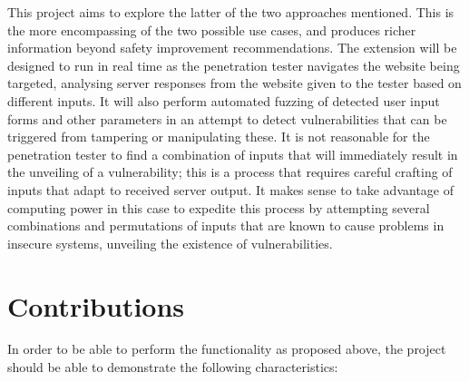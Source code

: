 This project aims to explore the latter of the two approaches mentioned. 
This is the more encompassing of the two possible use cases, and produces richer information beyond safety improvement recommendations. 
The extension will be designed to run in real time as the penetration tester navigates the website being targeted, analysing server responses from the website given to the tester based on different inputs. 
It will also perform automated fuzzing of detected user input forms and other parameters in an attempt to detect vulnerabilities that can be triggered from tampering or manipulating these.
It is not reasonable for the penetration tester to find a combination of inputs that will immediately result in the unveiling of a vulnerability; this is a process that requires careful crafting of inputs that adapt to received server output.
It makes sense to take advantage of computing power in this case to expedite this process by attempting several combinations and permutations of inputs that are known to cause problems in insecure systems, unveiling the existence of vulnerabilities.



\section{Contributions}


In order to be able to perform the functionality as proposed above, the project should be able to demonstrate the following characteristics:

